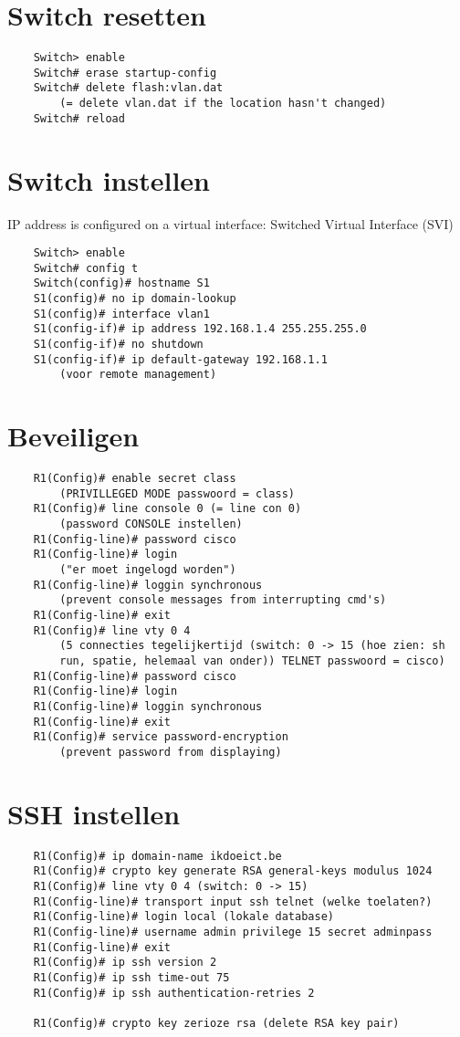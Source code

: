 \documentclass[10pt, a4paper]{article}
\begin{document}
	\section{Switch resetten}
	\begin{lstlisting}
	Switch> enable
	Switch# erase startup-config
	Switch# delete flash:vlan.dat 
		(= delete vlan.dat if the location hasn't changed)
	Switch# reload
	\end{lstlisting}
	
	\section{Switch instellen}
	IP address is configured on a virtual interface: Switched Virtual Interface (SVI)\\
	\begin{lstlisting}
	Switch> enable
	Switch# config t
	Switch(config)# hostname S1
	S1(config)# no ip domain-lookup
	S1(config)# interface vlan1
	S1(config-if)# ip address 192.168.1.4 255.255.255.0
	S1(config-if)# no shutdown
	S1(config-if)# ip default-gateway 192.168.1.1 
		(voor remote management)
	\end{lstlisting}
	
	\section{Beveiligen}
	\begin{lstlisting}
	R1(Config)# enable secret class 
		(PRIVILLEGED MODE passwoord = class)
	R1(Config)# line console 0 (= line con 0) 
		(password CONSOLE instellen)
	R1(Config-line)# password cisco
	R1(Config-line)# login 
		("er moet ingelogd worden")
	R1(Config-line)# loggin synchronous 
		(prevent console messages from interrupting cmd's)
	R1(Config-line)# exit
	R1(Config)# line vty 0 4 
		(5 connecties tegelijkertijd (switch: 0 -> 15 (hoe zien: sh
		run, spatie, helemaal van onder)) TELNET passwoord = cisco)
	R1(Config-line)# password cisco
	R1(Config-line)# login
	R1(Config-line)# loggin synchronous
	R1(Config-line)# exit
	R1(Config)# service password-encryption 
		(prevent password from displaying)
	\end{lstlisting}
	
	\section{SSH instellen}
	\begin{lstlisting}
	R1(Config)# ip domain-name ikdoeict.be
	R1(Config)# crypto key generate RSA general-keys modulus 1024
	R1(Config)# line vty 0 4 (switch: 0 -> 15)
	R1(Config-line)# transport input ssh telnet (welke toelaten?)
	R1(Config-line)# login local (lokale database)
	R1(Config-line)# username admin privilege 15 secret adminpass
	R1(Config-line)# exit
	R1(Config)# ip ssh version 2
	R1(Config)# ip ssh time-out 75
	R1(Config)# ip ssh authentication-retries 2
	
	R1(Config)# crypto key zerioze rsa (delete RSA key pair)
	\end{lstlisting}
	
\end{document}
